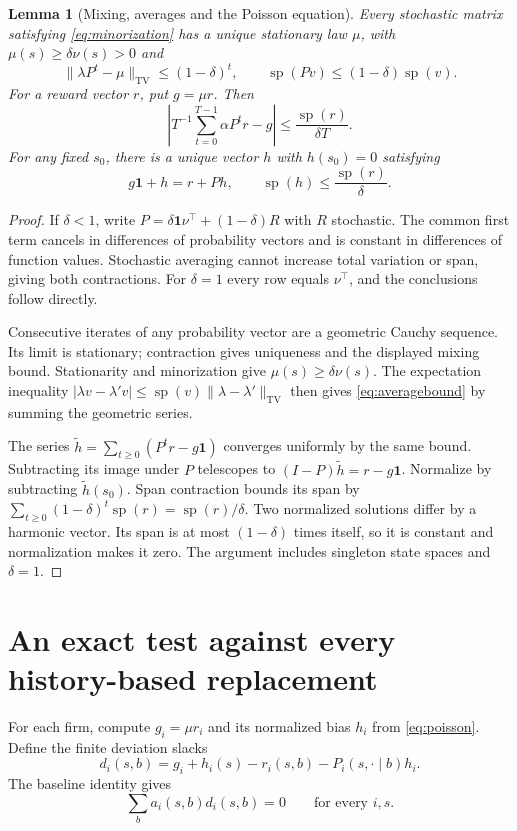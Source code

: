\documentclass[11pt,a4paper]{article}
\newtheorem{lemma}[theorem]{Lemma}
\newcommand{\spn}{\operatorname{sp}}
\newcommand{\TV}{\operatorname{TV}}
\begin{document}
\begin{lemma}[Mixing, averages and the Poisson equation]\label{lem:poisson}
Every stochastic matrix satisfying \eqref{eq:minorization} has a unique
stationary law $\mu$, with $\mu(s)\geq\delta\nu(s)>0$ and
\[
 \|\lambda P^t-\mu\|_{\TV}\leq(1-\delta)^t,
 \qquad \spn(Pv)\leq(1-\delta)\spn(v).
\]
For a reward vector $r$, put $g=\mu r$. Then
\begin{equation}\label{eq:averagebound}
 \left|T^{-1}\sum_{t=0}^{T-1}\alpha P^tr-g\right|
 \leq\frac{\spn(r)}{\delta T}.
\end{equation}
For any fixed $s_0$, there is a unique vector $h$ with $h(s_0)=0$ satisfying
\begin{equation}\label{eq:poisson}
 g\boldsymbol1+h=r+Ph,
 \qquad \spn(h)\leq\frac{\spn(r)}\delta.
\end{equation}
\end{lemma}
\begin{proof}
If $\delta<1$, write
$P=\delta\boldsymbol1\nu^\top+(1-\delta)R$ with $R$ stochastic.
The common first term cancels in differences of probability vectors and is
constant in differences of function values. Stochastic averaging cannot
increase total variation or span, giving both contractions. For $\delta=1$
every row equals $\nu^\top$, and the conclusions follow directly.

Consecutive iterates of any probability vector are a geometric Cauchy sequence.
Its limit is stationary; contraction gives uniqueness and the displayed mixing
bound. Stationarity and minorization give $\mu(s)\geq\delta\nu(s)$.
The expectation inequality
$|\lambda v-\lambda'v|\leq\spn(v)\|\lambda-\lambda'\|_{\TV}$ then gives
\eqref{eq:averagebound} by summing the geometric series.

The series $\widetilde h=\sum_{t\geq0}(P^tr-g\boldsymbol1)$ converges
uniformly by the same bound. Subtracting its image under $P$ telescopes to
$(I-P)\widetilde h=r-g\boldsymbol1$. Normalize by subtracting
$\widetilde h(s_0)$. Span contraction bounds its span by
$\sum_{t\geq0}(1-\delta)^t\spn(r)=\spn(r)/\delta$.
Two normalized solutions differ by a harmonic vector. Its span is at most
$(1-\delta)$ times itself, so it is constant and normalization makes it zero.
The argument includes singleton state spaces and $\delta=1$.
\end{proof}

\section{An exact test against every history-based replacement}
For each firm, compute $g_i=\mu r_i$ and its normalized bias $h_i$ from
\eqref{eq:poisson}. Define the finite deviation slacks
\begin{equation}\label{eq:slack}
 d_i(s,b)=g_i+h_i(s)-r_i(s,b)-P_i(s,\cdot\mid b)h_i.
\end{equation}
The baseline identity gives
\begin{equation}\label{eq:supportzero}
 \sum_ba_i(s,b)d_i(s,b)=0\qquad\text{for every }i,s.
\end{equation}
\end{document}
